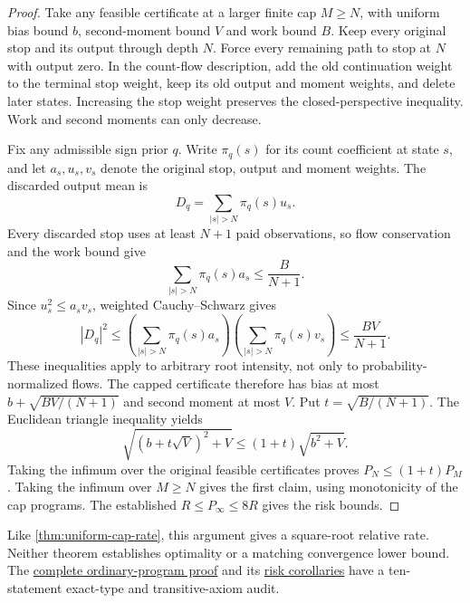 \begin{proof}
Take any feasible certificate at a larger finite cap $M\ge N$, with
uniform bias bound $b$, second-moment bound $V$ and work bound $B$.
Keep every original stop and its output through depth $N$. Force every
remaining path to stop at $N$ with output zero. In the count-flow
description, add the old continuation weight to the terminal stop weight,
keep its old output and moment weights, and delete later states.
Increasing the stop weight preserves the closed-perspective inequality.
Work and second moments can only decrease.

Fix any admissible sign prior $q$. Write $\pi_q(s)$ for its count
coefficient at state $s$, and let $a_s,u_s,v_s$ denote the original stop,
output and moment weights. The discarded output mean is
\[
 D_q=\sum_{|s|>N}\pi_q(s)u_s.
\]
Every discarded stop uses at least $N+1$ paid observations, so flow
conservation and the work bound give
\[
 \sum_{|s|>N}\pi_q(s)a_s\le\frac{B}{N+1}.
\]
Since $u_s^2\le a_sv_s$, weighted Cauchy--Schwarz gives
\[
 |D_q|^2\le
 \left(\sum_{|s|>N}\pi_q(s)a_s\right)
 \left(\sum_{|s|>N}\pi_q(s)v_s\right)
 \le\frac{BV}{N+1}.
\]
These inequalities apply to arbitrary root intensity, not only to
probability-normalized flows. The capped certificate therefore has bias
at most $b+\sqrt{BV/(N+1)}$ and second moment at most $V$.
Put $t=\sqrt{B/(N+1)}$. The Euclidean triangle inequality yields
\[
 \sqrt{(b+t\sqrt V)^2+V}\le(1+t)\sqrt{b^2+V}.
\]
Taking the infimum over the original feasible certificates proves
$P_N\le(1+t)P_M$. Taking the infimum over $M\ge N$ gives the first
claim, using monotonicity of the cap programs. The established
$R\le P_\infty\le8R$ gives the risk bounds.
\end{proof}

Like \cref{thm:uniform-cap-rate}, this argument gives a square-root
relative rate. Neither theorem establishes optimality or a matching
convergence lower bound. The
\href{https://github.com/davidiach/adaptive-threshold-estimation/blob/2dc570206292ce88a0636d82e9bdfff54663e80d/lean/ThresholdHC/FiniteCapTruncation/Full.lean}{complete ordinary-program proof}
and its
\href{https://github.com/davidiach/adaptive-threshold-estimation/blob/2dc570206292ce88a0636d82e9bdfff54663e80d/lean/ThresholdHC/FiniteCapTruncation/Risk.lean}{risk corollaries}
have a ten-statement exact-type and transitive-axiom audit.
